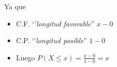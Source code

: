 \documentclass[handout]{beamer}\usepackage[]{graphicx}\usepackage[]{color}
\renewcommand{\leq}{\leqslant}
\theoremstyle{plain}
\theoremstyle{definition}
\begin{document}
\begin{frame}


Ya que
\begin{itemize}
\item C.F. `'\textit{longitud favorable}'' $x-0$
\item C.P. `'\textit{longitud posible}'' $1-0$
\item Luego $P(X\leq x)=\frac{x-0}{1-0}=x$
\end{itemize}

\end{frame}

% 
% 
% 
\end{document}
